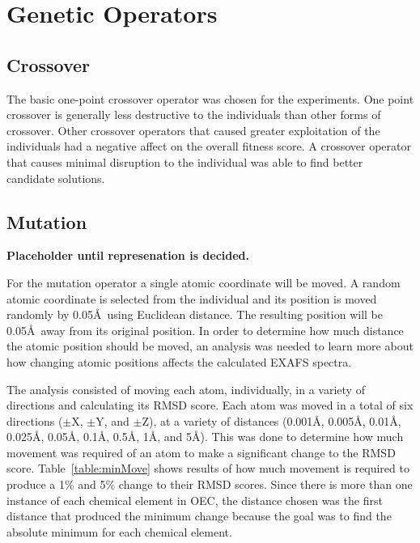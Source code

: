 \section{Genetic Operators}

\subsection{Crossover}

The basic one-point crossover operator was chosen for the experiments. One point crossover is generally less destructive to the individuals than other forms of crossover. Other crossover operators that caused greater exploitation of the individuals had a negative affect on the overall fitness score. A crossover operator that causes minimal disruption to the individual was able to find better candidate solutions.

\subsection{Mutation}

\textbf{Placeholder until represenation is decided.}

For the mutation operator a single atomic coordinate will be moved. A random atomic coordinate is selected from the individual and its position is moved randomly by 0.05\AA\  using Euclidean distance. The resulting position will be 0.05\AA\ away from its original position. In order to determine how much distance the atomic position should be moved, an analysis was needed to learn more about how changing atomic positions affects the calculated EXAFS spectra.

The analysis consisted of moving each atom, individually, in a variety of directions and calculating its RMSD score. Each atom was moved in a total of six directions ($\pm$X, $\pm$Y, and $\pm$Z), at a variety of distances (0.001\AA, 0.005\AA, 0.01\AA, 0.025\AA, 0.05\AA, 0.1\AA, 0.5\AA, 1\AA, and 5\AA). This was done to determine how much movement was required of an atom to make a significant change to the RMSD score. Table~\ref{table:minMove} shows results of how much movement is required to produce a 1\% and 5\% change to their RMSD scores. Since there is more than one instance of each chemical element in OEC, the distance chosen was the first distance that produced the minimum change because the goal was to find the absolute minimum for each chemical element.

